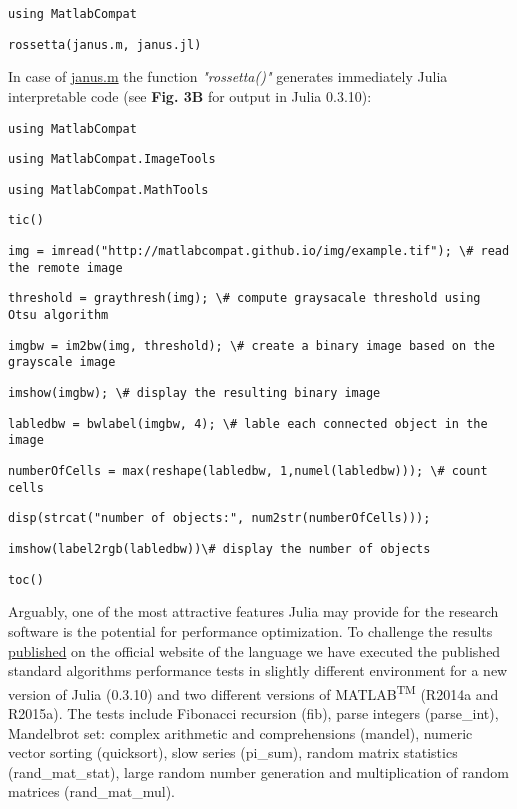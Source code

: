 \verb|using MatlabCompat|

\verb|rossetta(janus.m, janus.jl)|

In case of \href{https://github.com/MatlabCompat/MatlabCompat.jl/blob/dev/test/janus.m}{janus.m} the function \textit{"rossetta()"} generates immediately Julia interpretable code (see \textbf{Fig. 3B} for output in Julia 0.3.10):

\verb|using MatlabCompat|

\verb|using MatlabCompat.ImageTools|

\verb|using MatlabCompat.MathTools|

\verb|tic()|

\verb|img = imread("http://matlabcompat.github.io/img/example.tif"); \# read the remote image|

\verb|threshold = graythresh(img); \# compute graysacale threshold using Otsu algorithm|

\verb|imgbw = im2bw(img, threshold); \# create a binary image based on the grayscale image|

\verb|imshow(imgbw); \# display the resulting binary image|

\verb|labledbw = bwlabel(imgbw, 4); \# lable each connected object in the image|

\verb|numberOfCells = max(reshape(labledbw, 1,numel(labledbw))); \# count cells|

\verb|disp(strcat("number of objects:", num2str(numberOfCells)));|

\verb|imshow(label2rgb(labledbw))\# display the number of objects|

\verb|toc()|

Arguably, one of the most attractive features Julia may provide for the research software is the potential for performance optimization. To challenge the results \href{http://julialang.org/benchmarks/}{published} on the official website of the language we have executed the published standard algorithms performance tests in slightly different environment for a new version of Julia (0.3.10) and two different versions of MATLAB\textsuperscript{TM} (R2014a and R2015a). The tests include Fibonacci recursion (fib), parse integers (parse\_int), Mandelbrot set: complex arithmetic and comprehensions (mandel), numeric vector sorting (quicksort), slow \pi series (pi\_sum), random matrix statistics (rand\_mat\_stat), large random number generation and multiplication of random matrices (rand\_mat\_mul).

